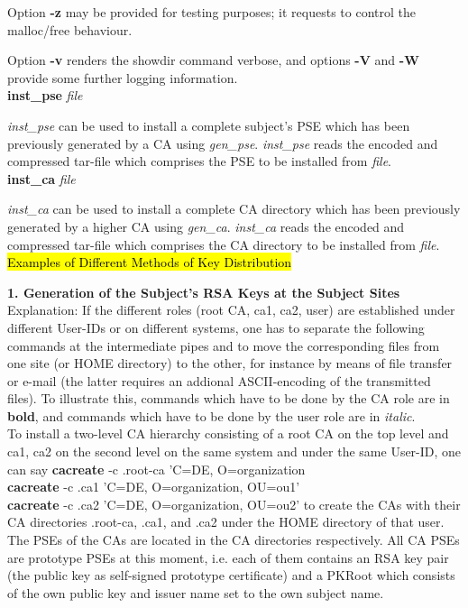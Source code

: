 Option {\bf -z} may be provided for testing purposes; it requests to control the malloc/free behaviour.

Option {\bf -v} renders the showdir command verbose, and options {\bf -V} and {\bf -W} 
provide some further logging
information.
\\ [1em]
{\bf inst\_pse} {\em file}

{\em inst\_pse} can be used to install a complete subject's PSE which has been previously
generated by a CA using {\em gen\_pse}. {\em inst\_pse} reads the encoded and compressed 
tar-file which comprises the PSE to be installed from {\em file}.
\\ [1em]
{\bf inst\_ca} {\em file}

{\em inst\_ca} can be used to install a complete CA directory which has been previously
generated by a higher CA using {\em gen\_ca}. {\em inst\_ca} reads the encoded and compressed 
tar-file which comprises the CA directory to be installed from {\em file}.
\newpage
\hl{Examples of Different Methods of Key Distribution}

{\bf 1. Generation of the Subject's RSA Keys at the Subject Sites}
\\ [1em]
{\small
Explanation: If the different roles (root CA, ca1, ca2, user) are established under different 
User-IDs or on different systems, one has to separate the following commands at the 
intermediate pipes and to move the corresponding files from one site (or
HOME directory) to the other, for instance by means of file transfer or e-mail (the
latter requires an addional ASCII-encoding of the transmitted files).
To illustrate this, commands which have to
be done by the CA role are in {\bf bold}, and commands which have to be done
by the user role are in {\em italic}.
}
\\ [1em]
To install a two-level CA hierarchy consisting of a root CA on the top level and ca1, ca2
on the second level on the same system and under the same User-ID, one can say
\bvtab
\1 {\bf cacreate} -c .root-ca 'C=DE, O=organization \\
\1 {\bf cacreate} -c .ca1 'C=DE, O=organization, OU=ou1' \\
\1 {\bf cacreate} -c .ca2 'C=DE, O=organization, OU=ou2'
\evtab
to create the CAs with their CA directories .root-ca, .ca1, and .ca2 under the HOME directory
of that user. The PSEs of the CAs are located in the CA directories respectively.
All CA PSEs are prototype PSEs at this moment, i.e. each of them contains an RSA key pair 
(the public key as self-signed prototype certificate) and a PKRoot which consists
of the own public key and issuer name set to the own subject name. 

